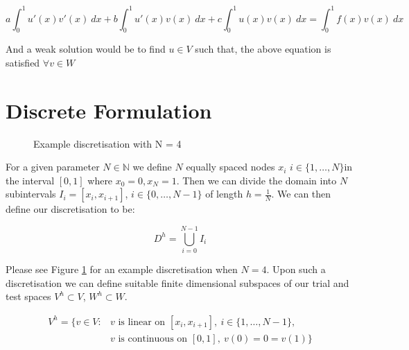 \begin{equation}\label{eq:wk-oned-deterministic}
	a\int_0^1{u'(x)v'(x)\ dx} + b\int_0^1{u'(x)v(x)\ dx} + c\int_0^1{u(x)v(x)\ dx} = 
    \int_0^1{f(x)v(x)\ dx}
\end{equation}

And a weak solution would be to find $u \in V$ such that, the above equation is 
satisfied $\forall v \in W$

\section{Discrete Formulation}

\begin{figure}
\centering
{}
\caption{Example discretisation with N = 4}
\label{fig:one-d-discretisation}
\end{figure}

For a given parameter $N \in \mathbb{N}$ we define $N$ equally spaced nodes $x_i$ 
$i \in \{1, \ldots, N\} $in the interval $[0,1]$ where $x_0 = 0, x_N = 1$. Then we
can divide the domain into $N$ subintervals $ I_i = [x_i, x_{i+1}]$,
$i \in \{0,\ldots,N - 1\}$ of length $h = \frac{1}{N}$. We can then define our 
discretisation to be:

\[
	D^h = \bigcup_{i=0}^{N - 1} I_i
\]

Please see Figure \ref{fig:one-d-discretisation} for an example discretisation when $N=4$.
Upon such a discretisation we can define suitable finite dimensional subspaces of our trial and
test spaces $V^h \subset V$, $W^h \subset W$.

\begin{align*}
	V^h = \{v \in V: &v \text{ is linear on } [x_i, x_{i+1}],\ i \in \{1, \ldots, N - 1\}, \\
               &v \text{ is continuous on } [0, 1],\ v(0) = 0 = v(1)\}
\end{align*}

